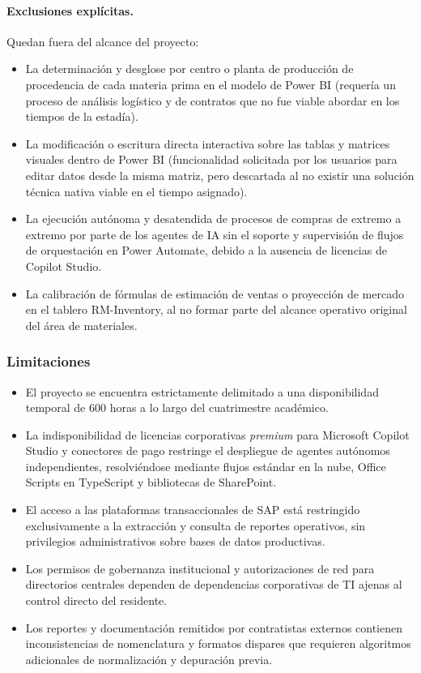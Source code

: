 \paragraph{Exclusiones explícitas.}
Quedan fuera del alcance del proyecto:
\begin{itemize}
    \item La determinación y desglose por centro o planta de producción de procedencia de cada materia prima en el modelo de Power BI (requería un proceso de análisis logístico y de contratos que no fue viable abordar en los tiempos de la estadía).
    \item La modificación o escritura directa interactiva sobre las tablas y matrices visuales dentro de Power BI (funcionalidad solicitada por los usuarios para editar datos desde la misma matriz, pero descartada al no existir una solución técnica nativa viable en el tiempo asignado).
    \item La ejecución autónoma y desatendida de procesos de compras de extremo a extremo por parte de los agentes de IA sin el soporte y supervisión de flujos de orquestación en Power Automate, debido a la ausencia de licencias de Copilot Studio.
    \item La calibración de fórmulas de estimación de ventas o proyección de mercado en el tablero RM-Inventory, al no formar parte del alcance operativo original del área de materiales.
\end{itemize}

\subsubsection{Limitaciones} \label{subsec:limitaciones}
\begin{itemize}
    \item El proyecto se encuentra estrictamente delimitado a una disponibilidad temporal de 600 horas a lo largo del cuatrimestre académico.
    \item La indisponibilidad de licencias corporativas \emph{premium} para Microsoft Copilot Studio y conectores de pago restringe el despliegue de agentes autónomos independientes, resolviéndose mediante flujos estándar en la nube, Office Scripts en TypeScript y bibliotecas de SharePoint.
    \item El acceso a las plataformas transaccionales de SAP está restringido exclusivamente a la extracción y consulta de reportes operativos, sin privilegios administrativos sobre bases de datos productivas.
    \item Los permisos de gobernanza institucional y autorizaciones de red para directorios centrales dependen de dependencias corporativas de TI ajenas al control directo del residente.
    \item Los reportes y documentación remitidos por contratistas externos contienen inconsistencias de nomenclatura y formatos dispares que requieren algoritmos adicionales de normalización y depuración previa.
\end{itemize}
